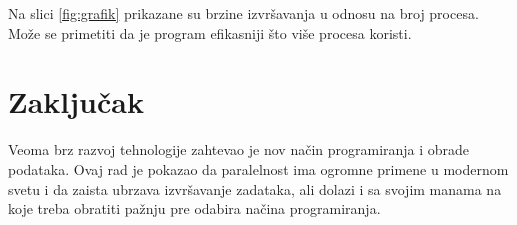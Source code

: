 \documentclass[a4paper]{article}
\begin{document}
    \par Na slici \ref{fig:grafik} prikazane su brzine izvršavanja u odnosu na broj procesa. Može se primetiti da je program efikasniji što više procesa koristi.
	
	\section{Zaključak}
	\label{sec:zakljucak}
	Veoma brz razvoj tehnologije zahtevao je nov način programiranja i obrade podataka. Ovaj rad je pokazao da paralelnost ima ogromne primene u modernom svetu i da zaista ubrzava izvršavanje zadataka, ali dolazi i sa svojim manama na koje treba obratiti pažnju pre odabira načina programiranja.
	
	\appendix
	

	
\end{document}

